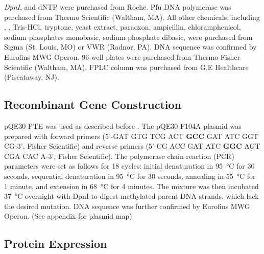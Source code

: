 \begin{refsection}
\emph{DpnI}, and dNTP were purchased from Roche.  Pfu DNA polymerase was
purchased from Thermo Scientific (Waltham, MA). All other chemicals, including
, , Tris-HCl, tryptone, yeast extract, paraoxon, ampicillin,
chloramphenicol, sodium phosphates monobasic, sodium phosphate dibasic, were
purchased from Sigma (St. Louis, MO) or VWR (Radnor, PA). DNA sequence was
confirmed by Eurofins MWG Operon.  96-well plates were purchased from Thermo
Fisher Scientific (Waltham, MA). FPLC column was purchased from G.E Healthcare
(Piscataway, NJ). 

\subsection{Recombinant Gene Construction}

pQE30-PTE was used as described before \cite{Baker2011b}. The pQE30-F104A plasmid
was prepared with forward primers (5\rq-GAT GTG TCG ACT \textbf{GCC} GAT ATC GGT
CG-3\rq, Fisher Scientific) and reverse primers (5\rq-CG ACC GAT ATC
\textbf{GGC} AGT CGA CAC A-3\rq, Fisher Scientific). The polymerase chain
reaction (PCR) parameters were set as follows for 18 cycles: initial
denaturation in \SI{95}{\celsius} for 30 seconds, sequential denaturation in
\SI{95}{\celsius} for 30 seconds, annealing in \SI{55}{\celsius} for 1 minute,
and extension in \SI{68}{\celsius} for 4 minutes. The mixture was then
incubated \SI{37}{\celsius} overnight with DpnI to digest methylated parent DNA
strands, which lack the desired mutation. DNA sequence was further confirmed by
Eurofins MWG Operon. (See appendix for plasmid map)

\subsection{Protein Expression}
\label{sec:protein-expression-method}


\end{refsection}
